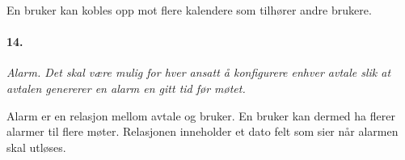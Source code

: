 \documentclass[titlepage]{article}
\begin{document}
En bruker kan kobles opp mot flere kalendere som tilhører andre brukere.


\paragraph{14.}\textit{ Alarm. Det skal være mulig for hver ansatt å konfigurere enhver avtale slik at avtalen
genererer en alarm en gitt tid før møtet.}

Alarm er en relasjon mellom avtale og bruker. En bruker kan dermed ha flerer alarmer til flere møter. Relasjonen inneholder et dato felt som sier når alarmen skal utløses.
\end{document}

